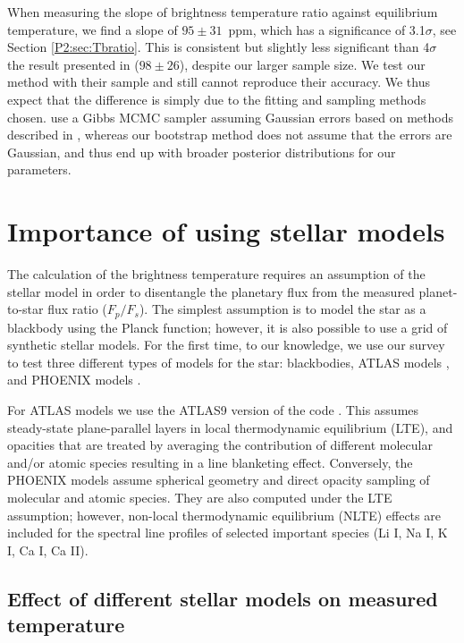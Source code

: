 \begin{subappendices}
When measuring the slope of brightness temperature ratio against equilibrium temperature, we find a slope of $95\pm31$~ppm, which has a significance of 3.1$\sigma$, see Section \ref{P2:sec:Tbratio}. This is consistent but slightly less significant than 4$\sigma$ the result presented in \citet{Garhart2020} ($98\pm26$), despite our larger sample size. We test our method with their sample and still cannot reproduce their accuracy. We thus expect that the difference is simply due to the fitting and sampling methods chosen. \citet{Garhart2020} use a Gibbs MCMC sampler assuming Gaussian errors based on methods described in \citet{Kelly2007}, whereas our bootstrap method does not assume that the errors are Gaussian, and thus end up with broader posterior distributions for our parameters.

\section{Importance of using stellar models}
\label{P2:app:StellarModels}

The calculation of the brightness temperature requires an assumption of the stellar model in order to disentangle the planetary flux from the measured planet-to-star flux ratio ($F_p/F_s$). The simplest assumption is to model the star as a blackbody using the Planck function; however, it is also possible to use a grid of synthetic stellar models. For the first time, to our knowledge, we use our survey to test three different types of models for the star: blackbodies, ATLAS models \citep{Kurucz1979}, and PHOENIX models \citep{Allard1995, Husser2013}.

For ATLAS models we use the ATLAS9 version of the code \citep{Castelli2003}. This assumes steady-state plane-parallel layers in local thermodynamic equilibrium (LTE), and opacities that are treated by averaging the contribution of different molecular and/or atomic species resulting in a line blanketing effect. Conversely, the PHOENIX models assume spherical geometry and direct opacity sampling of molecular and atomic species. They are also computed under the LTE assumption; however, non-local thermodynamic equilibrium (NLTE) effects are included for the spectral line profiles of selected important species (Li I, Na I, K I, Ca I, Ca II).

\subsection{Effect of different stellar models on measured temperature}


\end{subappendices}
